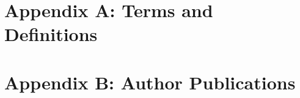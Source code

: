 
\chapter{Appendix A: Terms and Definitions}
\label{chap:terms_definitions}

\chapter{Appendix B: Author Publications}
\label{chap:publications}
